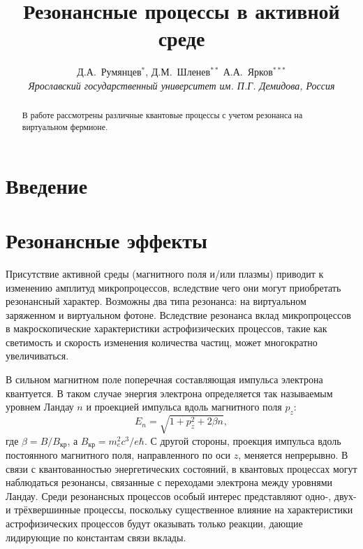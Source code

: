 \documentclass[12pt]{article}
\title{Резонансные процессы в активной среде}
\author{Д.А.~Румянцев$^{*}$, Д.М.~Шленев$^{**}$
А.А.~Ярков$^{***}$
\\
{\it Ярославский государственный университет им. П.Г. Демидова, Россия}}
\date{}
\begin{document}
\large
\maketitle
\def\abstractname{\empty}
\baselineskip=22pt

\begin{abstract}

\baselineskip=20pt

{\large В работе рассмотрены различные квантовые процессы с учетом резонанса на виртуальном фермионе.}
\end{abstract}

{\def\thefootnote{*}
\def\thefootnote{**}
\def\thefootnote{***}
}

\newpage
\unitlength 1mm

\section{Введение}
\section{Резонансные эффекты}
Присутствие активной среды (магнитного поля и/или плазмы) приводит к изменению амплитуд микропроцессов, вследствие чего они могут приобретать резонансный характер. Возможны два типа резонанса: на виртуальном 
заряженном и виртуальном фотоне. Вследствие резонанса вклад микропроцессов в макроскопические характеристики астрофизических процессов, такие как светимость и скорость изменения количества частиц, может 
многократно увеличиваться.

В сильном магнитном поле поперечная составляющая импульса электрона квантуется. В таком случае энергия электрона определяется так называемым уровнем Ландау $n$ и проекцией импульса вдоль магнитного поля $p_z$:
\begin{equation}
E_n = \sqrt{1+p_z^2+2\beta n},
\end{equation}
%
где $\beta=B/B_{кр}$, а $B_{кр} = m_e^2 c^3/e\hbar$. С другой стороны, проекция импульса вдоль постоянного магнитного поля, направленного по оси $z$, меняется непрерывно. 
В связи с квантованностью энергетических состояний, в квантовых процессах могут наблюдаться резонансы, связанные с переходами электрона между уровнями Ландау. 
Среди резонансных процессов особый интерес представляют одно-, двух- и трёхвершинные процессы, поскольку существенное влияние на характеристики астрофизических процессов
будут оказывать только реакции, дающие лидирующие по константам связи вклады.
	
\end{document}
